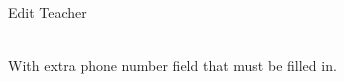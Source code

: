 
\begin{uc}{Edit Teacher}

     \\
    With extra phone number field that must be filled in.

\end{uc}
